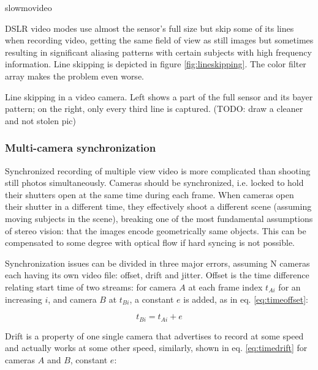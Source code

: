 slowmovideo 
\cite{eugster2011slowmovideo}

DSLR video modes use almost the sensor's full size but skip some of its lines when recording video, getting the same field of view as still images but sometimes resulting in significant aliasing patterns with certain subjects with high frequency information.
Line skipping is depicted in figure \ref{fig:lineskipping}.
The color filter array makes the problem even worse.

{Line skipping in a video camera. Left shows a part of the full sensor and its bayer pattern; on the right, only every third line is captured. (TODO: draw a cleaner and not stolen pic)}



\subsubsection{Multi-camera synchronization} %


Synchronized recording of multiple view video is more complicated than shooting still photos simultaneously.
Cameras should be synchronized, i.e. locked to hold their shutters open at the same time during each frame.
When cameras open their shutter in a different time, they effectively shoot a different scene (assuming moving subjects in the scene), breaking one of the most fundamental assumptions of stereo vision: that the images encode geometrically same objects.
This can be compensated to some degree with optical flow if hard syncing is not possible. \cite{bradley2009synchronization}

Synchronization issues can be divided in three major errors, assuming N cameras each having its own video file: offset, drift and jitter.
Offset is the time difference relating start time of two streams: for camera $A$ at each frame index $t_{Ai}$ for an increasing $i$, and camera $B$ at $t_{Bi}$, a constant $e$ is added, as in eq. \ref{eq:timeoffset}:

\begin{equation} \label{eq:timeoffset}
	t_{Bi} = t_{Ai} + e
\end{equation}

Drift is a property of one single camera that advertises to record at some speed and actually works at some other speed, similarly, shown in eq. \ref{eq:timedrift} for cameras $A$ and $B$, constant $e$:

